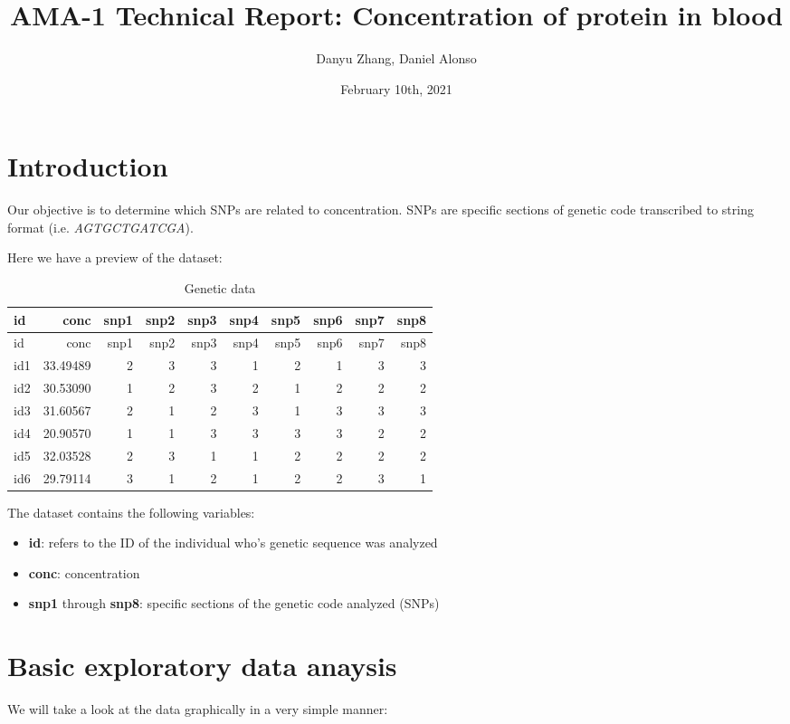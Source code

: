 \documentclass[]{article}
\title{AMA-1 Technical Report: Concentration of protein in blood}
\author{Danyu Zhang, Daniel Alonso}
\date{February 10th, 2021}
\providecommand{\tightlist}{%
  \setlength{\itemsep}{0pt}\setlength{\parskip}{0pt}}
\begin{document}
\maketitle

\hypertarget{introduction}{%
\section{Introduction}\label{introduction}}

Our objective is to determine which SNPs are related to concentration.
SNPs are specific sections of genetic code transcribed to string format
(i.e. \emph{AGTGCTGATCGA}).

Here we have a preview of the dataset:

\begin{longtable}[]{@{}lrrrrrrrrr@{}}
\caption{Genetic data}\tabularnewline
\toprule
id & conc & snp1 & snp2 & snp3 & snp4 & snp5 & snp6 & snp7 &
snp8\tabularnewline
\midrule
\endfirsthead
\toprule
id & conc & snp1 & snp2 & snp3 & snp4 & snp5 & snp6 & snp7 &
snp8\tabularnewline
\midrule
\endhead
id1 & 33.49489 & 2 & 3 & 3 & 1 & 2 & 1 & 3 & 3\tabularnewline
id2 & 30.53090 & 1 & 2 & 3 & 2 & 1 & 2 & 2 & 2\tabularnewline
id3 & 31.60567 & 2 & 1 & 2 & 3 & 1 & 3 & 3 & 3\tabularnewline
id4 & 20.90570 & 1 & 1 & 3 & 3 & 3 & 3 & 2 & 2\tabularnewline
id5 & 32.03528 & 2 & 3 & 1 & 1 & 2 & 2 & 2 & 2\tabularnewline
id6 & 29.79114 & 3 & 1 & 2 & 1 & 2 & 2 & 3 & 1\tabularnewline
\bottomrule
\end{longtable}

The dataset contains the following variables:

\begin{itemize}
\tightlist
\item
  \textbf{id}: refers to the ID of the individual who's genetic sequence
  was analyzed
\item
  \textbf{conc}: concentration
\item
  \textbf{snp1} through \textbf{snp8}: specific sections of the genetic
  code analyzed (SNPs)
\end{itemize}

\hypertarget{basic-exploratory-data-anaysis}{%
\section{Basic exploratory data
anaysis}\label{basic-exploratory-data-anaysis}}

We will take a look at the data graphically in a very simple manner:
\end{document}
